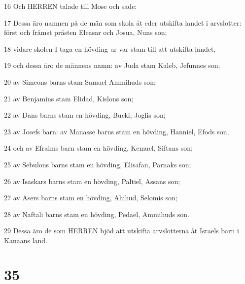 \par 16 Och HERREN talade till Mose och sade:
\par 17 Dessa äro namnen på de män som skola åt eder utskifta landet i arvslotter: först och främst prästen Eleasar och Josua, Nuns son;
\par 18 vidare skolen I taga en hövding ur var stam till att utskifta landet,
\par 19 och dessa äro de männens namn: av Juda stam Kaleb, Jefunnes son;
\par 20 av Simeons barns stam Samuel Ammihuds son;
\par 21 av Benjamins stam Elidad, Kislons son;
\par 22 av Dans barns stam en hövding, Bucki, Joglis son;
\par 23 av Josefs barn: av Manasse barns stam en hövding, Hanniel, Efods son,
\par 24 och av Efraims barn stam en hövding, Kemuel, Siftans son;
\par 25 av Sebulons barns stam en hövding, Elisafan, Parnaks son;
\par 26 av Isaskars barns stam en hövding, Paltiel, Assans son;
\par 27 av Asers barns stam en hövding, Ahihud, Selomis son;
\par 28 av Naftali barns stam en hövding, Pedael, Ammihuds son.
\par 29 Dessa äro de som HERREN bjöd att utskifta arvslotterna åt Israels barn i Kanaans land.

\chapter{35}

